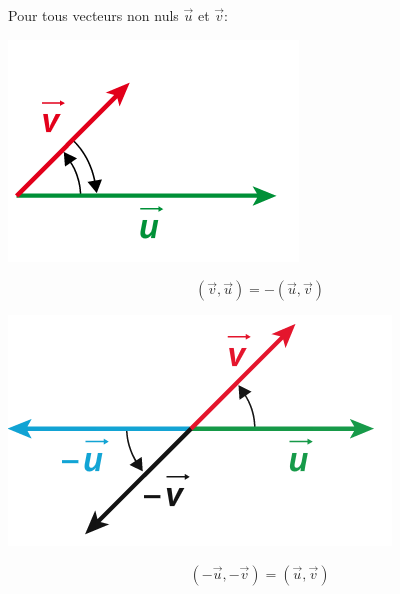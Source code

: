 \documentclass[a4paper,11pt]{article}
\theoremstyle{break}
\begin{document}
\begin{proposition}
 Pour tous vecteurs non nuls $\vec{u}$ et $\vec{v}$:
 \begin{multicols}{2}
  
  
  \begin{center}
    \includegraphics[scale=0.5]{../Images/moinsuv.png}
  \end{center}
  $$(\vec{v},\vec{u})=-(\vec{u},\vec{v})$$
  
  \columnbreak 
  
  
  \begin{center}
    \includegraphics[scale=0.5]{../Images/moinsUetmoinsV.png}
  \end{center}
  $$(-\vec{u},-\vec{v})=(\vec{u},\vec{v})$$
  
  \end{multicols}
  

  
\end{proposition}
\end{document}
